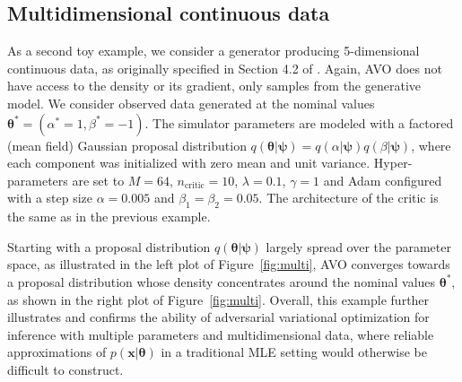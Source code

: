 \documentclass{article}
\newcommand{\bftheta}{{\bm \theta}}
\newcommand{\bfpsi}{{\bm \psi}}
\newcommand{\bfz}{\mathbf{z}}
\theoremstyle{plain}
\begin{document}
\subsection{Multidimensional continuous data}

As a second toy example, we consider a generator producing
5-dimensional continuous data, as originally specified in Section 4.2 of
\cite{cranmer2015approximating}.
Again, AVO does not have access to the density or its gradient, only samples from the generative model.
We consider observed data generated at the nominal values $\bftheta^* = (\alpha^*=1,\beta^*=-1)$.
The simulator parameters are modeled with a factored  (mean field) Gaussian
proposal distribution $q(\bftheta|\bfpsi) = q(\alpha|\bfpsi) q(\beta|\bfpsi)$, where each component was
initialized with zero mean and unit variance.
Hyper-parameters are set to $M=64$, $n_\text{critic}=10$, $\lambda=0.1$, $\gamma=1$ and
Adam configured with a step size $\alpha=0.005$ and $\beta_1=\beta_2=0.05$.
The architecture of the critic is the same as in the previous example.

Starting with a proposal distribution $q(\bftheta|\bfpsi)$ largely spread over
the parameter space, as illustrated in the left plot of Figure~\ref{fig:multi},
AVO converges towards a proposal distribution whose density
concentrates around the nominal values $\bftheta^*$, as shown in the right plot of Figure~\ref{fig:multi}.
Overall, this example further illustrates and confirms the ability of adversarial
variational optimization for inference with multiple parameters and multidimensional
data, where reliable approximations of $p(\mathbf{x}|\bftheta)$ in a traditional
MLE setting would otherwise be difficult to construct.
\end{document}
